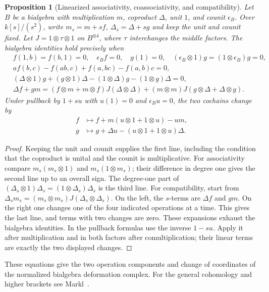 \documentclass[11pt,oneside,openany]{book}
\newtheorem{proposition}[theorem]{Proposition}
\theoremstyle{definition}
\theoremstyle{remark}
\begin{document}
\begin{proposition}[Linearized associativity, coassociativity, and compatibility]
\label{res:LD07}
Let \(B\) be a bialgebra with multiplication \(m\), coproduct \(\Delta\),
unit \(1\), and counit \(\epsilon_B\).
Over \(k[s]/(s^2)\), write \(m_s=m+sf\), \(\Delta_s=\Delta+sg\)
and keep the unit and counit fixed. Let
\(J=1\otimes\tau\otimes1\) on \(B^{\otimes4}\), where
\(\tau\) interchanges the middle factors.
The bialgebra identities hold precisely when
\[
 \begin{aligned}
 &f(1,b)=f(b,1)=0,\quad \epsilon_B f=0,\quad
   g(1)=0,\quad (\epsilon_B\otimes1)g=(1\otimes\epsilon_B)g=0,\\
 &a f(b,c)-f(ab,c)+f(a,bc)-f(a,b)c=0,\\
 &(\Delta\otimes1)g+(g\otimes1)\Delta
        -(1\otimes\Delta)g-(1\otimes g)\Delta=0,\\
 &\Delta f+gm=(f\otimes m+m\otimes f)J(\Delta\otimes\Delta)
             +(m\otimes m)J(g\otimes\Delta+\Delta\otimes g).
 \end{aligned}
\]
Under pullback by \(1+s u\) with \(u(1)=0\) and
\(\epsilon_B u=0\), the two cochains change by
\[
 \begin{aligned}
 f&\longmapsto f+m(u\otimes1+1\otimes u)-u m,\\
 g&\longmapsto g+\Delta u-(u\otimes1+1\otimes u)\Delta.
 \end{aligned}
\]
\end{proposition}
\begin{proof}
Keeping the unit and counit supplies the first line, including
the condition that the coproduct is unital and the counit is
multiplicative. For associativity compare
\(m_s(m_s\otimes1)\) and \(m_s(1\otimes m_s)\);
their difference in degree one gives the second line up to
an overall sign. The degree-one part of
\((\Delta_s\otimes1)\Delta_s=(1\otimes\Delta_s)\Delta_s\)
is the third line. For compatibility, start from
\(\Delta_s m_s=(m_s\otimes m_s)J(\Delta_s\otimes\Delta_s)\).
On the left, the \(s\)-terms are \(\Delta f\) and \(gm\).
On the right one changes one of the four indicated operations
at a time. This gives the last line, and terms with two changes
are zero. These expansions exhaust the bialgebra identities.
In the pullback formulas use the inverse \(1-su\). Apply it
after multiplication and in both factors after comultiplication;
their linear terms are exactly the two displayed changes.
\end{proof}

These equations give the two operation components and change of
coordinates of the normalized bialgebra deformation complex.
For the general cohomology and higher brackets see
Markl~\cite[Section 6]{markl}.
\end{document}
